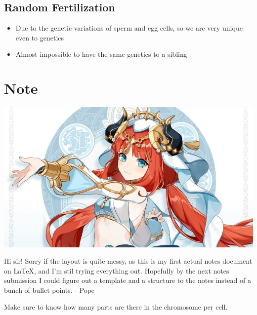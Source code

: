 \documentclass{article}
\begin{document}
\subsection*{Random Fertilization}
\begin{itemize}
    \item Due to the genetic variations of sperm and egg cells, so we are very unique even to genetics
    \item Almost impossible to have the same genetics to a sibling
\end{itemize}
\section*{Note}
\includegraphics*[scale=0.3]{nilou.png}


Hi sir! Sorry if the layout is quite messy, as this is my first actual notes document on LaTeX, and I'm stil trying everything out. Hopefully by the next notes submission I could figure out a template and a structure to the notes instead of a bunch of bullet points. - Pope


Make sure to know how many parts are there in the chromosome per cell.
\end{document}
